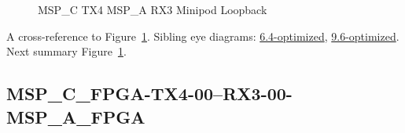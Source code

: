 \begin{figure}[h]
\begin{subfigure}{0.33\textwidth}
\hyperref[sec:MSPCFPGATX406RX306MSPAFPGA12.8-optimized]{}
\end{subfigure}\hspace*{\fill}
\begin{subfigure}{0.33\textwidth}
\hyperref[sec:MSPCFPGATX407RX307MSPAFPGA12.8-optimized]{}
\end{subfigure}\hspace*{\fill}
\begin{subfigure}{0.33\textwidth}
\hyperref[sec:MSPCFPGATX408RX308MSPAFPGA12.8-optimized]{}
\end{subfigure}

\begin{subfigure}{0.33\textwidth}
\hyperref[sec:MSPCFPGATX409RX309MSPAFPGA12.8-optimized]{}
\end{subfigure}\hspace*{\fill}
\begin{subfigure}{0.33\textwidth}
\hyperref[sec:MSPCFPGATX410RX310MSPAFPGA12.8-optimized]{}
\end{subfigure}\hspace*{\fill}
\begin{subfigure}{0.33\textwidth}
\hyperref[sec:MSPCFPGATX411RX311MSPAFPGA12.8-optimized]{}
\end{subfigure}

\caption{MSP\_C TX4 MSP\_A RX3 Minipod Loopback} \label{fig:MSPCTX4MSPARX3MinipodLoopback12.8-optimized}
\end{figure}

A cross-reference to Figure~\ref{fig:MSPCTX4MSPARX3MinipodLoopback12.8-optimized}.
Sibling eye diagrams: \hyperref[sec:MSPCTX4MSPARX3MinipodLoopback6.4-optimized]{6.4-optimized}, \hyperref[sec:MSPCTX4MSPARX3MinipodLoopback9.6-optimized]{9.6-optimized}. \\
Next summary Figure~\ref{fig:MSPCTX4MSPARX3MinipodLoopback12.8-optimized}.
\clearpage
% 
\subsection{MSP\_C\_FPGA-TX4-00--RX3-00-MSP\_A\_FPGA}\label{sec:MSPCFPGATX400RX300MSPAFPGA12.8-optimized}


